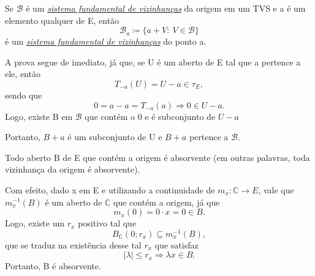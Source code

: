 \documentclass[../distribution_theory_notes.tex]{subfiles}
\begin{document}
\begin{theorem*}
	Se \(\mathcal{B}\) é um \hyperlink{sistema_fundamental_vizinhas}{\textit{sistema fundamental de vizinhanças}} da origem em um TVS e a é um elemento qualquer de E, então
	\[
		\mathcal{B}_{a}\coloneqq \{a + V:\:V\in \mathcal{B}\}
	\]
	é um \hyperlink{sistema_fundamental_vizinhas}{\textit{sistema fundamental de vizinhanças}} do ponto a.
\end{theorem*}
\begin{proof*}
	A prova segue de imediato, já que, se U é um aberto de E tal que a pertence a ele, então
	\[
		T_{-a}(U) = U-a\in\tau_{E},
	\]
	sendo que
	\[
		0 = a - a = T_{-a}(a) \Rightarrow 0\in U-a.
	\]
	Logo, existe B em \(\mathcal{B}\) que contém o 0 e é subconjunto de \(U-a\)

	Portanto, \(B+a\) é um subconjunto de U e \(B+a\) pertence a \(\mathcal{B}\). \qedsymbol
\end{proof*}
\begin{theorem*}
	Todo aberto B de E que contém a origem é absorvente (em outras palavras, toda vizinhança da origem é absorvente).
\end{theorem*}
\begin{proof*}
	Com efeito, dado x em E e utilizando a continuidade de \(m_{x}:\mathbb{C}\rightarrow E\), vale que \(m_{x}^{-1}(B)\) é um aberto de \(\mathbb{C}\) que contém a origem, já que
	\[
		m_{x}(0)=0 \cdot x = 0\in B.
	\]
	Logo, existe um \(r_{x}\) positivo tal que
	\[
		B_{\mathbb{C}}(0; r_{x}) \subseteq m_{x}^{-1}(B),
	\]
	que se traduz na existência desse tal \(r_{x}\) que satisfaz
	\[
		|\lambda |\leq r_{x}\Rightarrow \lambda x \in B.
	\]
	Portanto, B é absorvente. \qedsymbol
\end{proof*}
\end{document}
